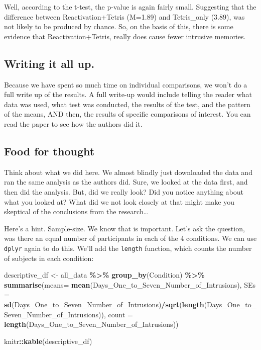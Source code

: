 \documentclass[
]{book}
\newenvironment{Shaded}{\begin{snugshade}}{\end{snugshade}}
\newcommand{\AttributeTok}[1]{\textcolor[rgb]{0.13,0.29,0.53}{#1}}
\newcommand{\FunctionTok}[1]{\textcolor[rgb]{0.13,0.29,0.53}{\textbf{#1}}}
\newcommand{\NormalTok}[1]{#1}
\newcommand{\OtherTok}[1]{\textcolor[rgb]{0.56,0.35,0.01}{#1}}
\newcommand{\SpecialCharTok}[1]{\textcolor[rgb]{0.81,0.36,0.00}{\textbf{#1}}}
\begin{document}
Well, according to the t-test, the p-value is again fairly small. Suggesting that the difference between Reactivation+Tetris (M=1.89) and Tetris\_only (3.89), was not likely to be produced by chance. So, on the basis of this, there is some evidence that Reactivation+Tetris, really does cause fewer intrusive memories.

\hypertarget{writing-it-all-up.}{%
\subsection{Writing it all up.}\label{writing-it-all-up.}}

Because we have spent so much time on individual comparisons, we won't do a full write up of the results. A full write-up would include telling the reader what data was used, what test was conducted, the results of the test, and the pattern of the means, AND then, the results of specific comparisons of interest. You can read the paper to see how the authors did it.

\hypertarget{food-for-thought}{%
\subsection{Food for thought}\label{food-for-thought}}

Think about what we did here. We almost blindly just downloaded the data and ran the same analysis as the authors did. Sure, we looked at the data first, and then did the analysis. But, did we really look? Did you notice anything about what you looked at? What did we not look closely at that might make you skeptical of the conclusions from the research\ldots{}

Here's a hint. Sample-size. We know that is important. Let's ask the question, was there an equal number of participants in each of the 4 conditions. We can use \texttt{dplyr} again to do this. We'll add the \texttt{length} function, which counts the number of subjects in each condition:

\begin{Shaded}
\begin{Highlighting}[]
\NormalTok{descriptive\_df }\OtherTok{\textless{}{-}}\NormalTok{ all\_data }\SpecialCharTok{\%\textgreater{}\%} 
                    \FunctionTok{group\_by}\NormalTok{(Condition) }\SpecialCharTok{\%\textgreater{}\%} 
                    \FunctionTok{summarise}\NormalTok{(}\AttributeTok{means=} \FunctionTok{mean}\NormalTok{(Days\_One\_to\_Seven\_Number\_of\_Intrusions),}
                              \AttributeTok{SEs =} \FunctionTok{sd}\NormalTok{(Days\_One\_to\_Seven\_Number\_of\_Intrusions)}\SpecialCharTok{/}\FunctionTok{sqrt}\NormalTok{(}\FunctionTok{length}\NormalTok{(Days\_One\_to\_Seven\_Number\_of\_Intrusions)),}
                              \AttributeTok{count =} \FunctionTok{length}\NormalTok{(Days\_One\_to\_Seven\_Number\_of\_Intrusions))}

\NormalTok{knitr}\SpecialCharTok{::}\FunctionTok{kable}\NormalTok{(descriptive\_df)}
\end{Highlighting}
\end{Shaded}
\end{document}
